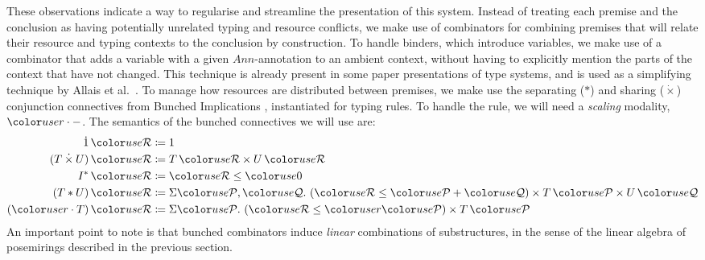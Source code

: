 These observations indicate a way to regularise and streamline the
presentation of this system. Instead of treating each premise and the
conclusion as having potentially unrelated typing and resource
conflicts, we make use of combinators for combining premises that will
relate their resource and typing contexts to the conclusion by
construction. To handle binders, which introduce variables, we make
use of a combinator that adds a variable with a given $Ann$-annotation
to an ambient context, without having to explicitly mention the parts
of the context that have not changed. This technique is already
present in some paper presentations of type systems, and is used as a
simplifying technique by Allais et al.~\cite{AACMM20}. To manage how
resources are distributed between premises, we make use the separating
($*$) and sharing ($\dot{\times}$) conjunction connectives from
Bunched Implications \cite{oHP99}, instantiated for typing rules. To
handle the  rule, we will need a
\emph{scaling} modality, $\gr r \cdot -$. The semantics of the bunched
connectives we will use are:
  \begin{align*}
    \dot1\,\grR &\coloneqq 1 \\
    (T \dottimes U)\,\grR &\coloneqq T\,\grR \times U\,\grR \\
    I^*\,\grR &\coloneqq \grR \leq \gr0 \\
    (T \sep U)\,\grR &\coloneqq \Sigma \grP,\grQ.~\plr{\grR \leq \grP + \grQ}
                       \times T\,\grP \times U\,\grQ \\
    (\gr r \cdot T)\,\grR &\coloneqq \Sigma \grP.~\plr{\grR \leq \gr r\grP}
                       \times T\,\grP \\
  \end{align*}
An important point to note is that bunched combinators induce
\emph{linear} combinations of substructures, in the sense of the
linear algebra of posemirings described in the previous section.

